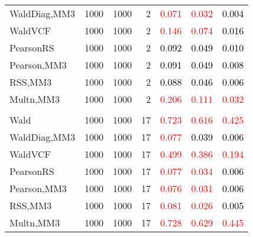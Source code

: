 \documentclass[
]{article}
\begin{document}
\begin{table}[H]
{\begin{tabular}[t]{lrrrrrr}
\hspace{1em}WaldDiag,MM3 & 1000 & 1000 & 2 & \textcolor{red}{0.071} & \textcolor{red}{0.032} & \textcolor{black}{0.004}\\
\hspace{1em}WaldVCF & 1000 & 1000 & 2 & \textcolor{red}{0.146} & \textcolor{red}{0.074} & \textcolor{black}{0.016}\\
\hspace{1em}PearsonRS & 1000 & 1000 & 2 & \textcolor{black}{0.092} & \textcolor{black}{0.049} & \textcolor{black}{0.010}\\
\hspace{1em}Pearson,MM3 & 1000 & 1000 & 2 & \textcolor{black}{0.091} & \textcolor{black}{0.049} & \textcolor{black}{0.008}\\
\hspace{1em}RSS,MM3 & 1000 & 1000 & 2 & \textcolor{black}{0.088} & \textcolor{black}{0.046} & \textcolor{black}{0.006}\\
\hspace{1em}Multn,MM3 & 1000 & 1000 & 2 & \textcolor{red}{0.206} & \textcolor{red}{0.111} & \textcolor{red}{0.032}\\
\addlinespace[0.3em]
\multicolumn{7}{l}{\textbf{1F 15V}}\\
\hspace{1em}Wald & 1000 & 1000 & 17 & \textcolor{red}{0.723} & \textcolor{red}{0.616} & \textcolor{red}{0.425}\\
\hspace{1em}WaldDiag,MM3 & 1000 & 1000 & 17 & \textcolor{red}{0.077} & \textcolor{black}{0.039} & \textcolor{black}{0.006}\\
\hspace{1em}WaldVCF & 1000 & 1000 & 17 & \textcolor{red}{0.499} & \textcolor{red}{0.386} & \textcolor{red}{0.194}\\
\hspace{1em}PearsonRS & 1000 & 1000 & 17 & \textcolor{red}{0.077} & \textcolor{red}{0.034} & \textcolor{black}{0.006}\\
\hspace{1em}Pearson,MM3 & 1000 & 1000 & 17 & \textcolor{red}{0.076} & \textcolor{red}{0.031} & \textcolor{black}{0.006}\\
\hspace{1em}RSS,MM3 & 1000 & 1000 & 17 & \textcolor{red}{0.081} & \textcolor{red}{0.026} & \textcolor{black}{0.005}\\
\hspace{1em}Multn,MM3 & 1000 & 1000 & 17 & \textcolor{red}{0.728} & \textcolor{red}{0.629} & \textcolor{red}{0.445}\\

\end{tabular}}
\end{table}
\end{document}
